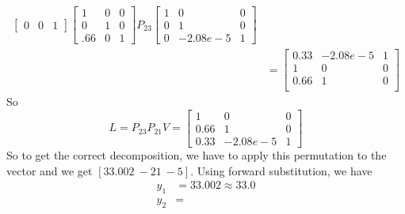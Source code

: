 \documentclass{homework}
\begin{document}
\begin{solution}
\[\begin{aligned}
\begin{bmatrix}
      0 & 0 & 1
    \end{bmatrix}
    \begin{bmatrix}
      1 & 0 & 0 \\
      0 & 1 & 0 \\
      .66 & 0 & 1
    \end{bmatrix}
    P_{23}
    \begin{bmatrix}
      1 & 0 & 0 \\
      0 & 1 & 0 \\
      0 & -2.08e-5 & 1
    \end{bmatrix} \\
    &=
    \begin{bmatrix}
      0.33 & -2.08e-5 & 1 \\
      1 & 0 & 0 \\
      0.66 & 1 & 0 \\
    \end{bmatrix}
  \end{aligned}
  \]
  So
  \[
    L = 
    P_{23}P_{21}V = 
    \begin{bmatrix}
      1 & 0 & 0 \\
      0.66 & 1 & 0 \\
      0.33 & -2.08e-5 & 1 
    \end{bmatrix}
  \]
  So to get the correct decomposition, we have to apply this permutation to the vector and we get $[33.002\ -21\ -5]$.
  Using forward substitution, we have
  \[
    \begin{aligned}
      y_1 &= 33.002 \approx 33.0 \\
      y_2 &= \\
    \end{aligned}
  \]
\end{solution}
\end{document}
